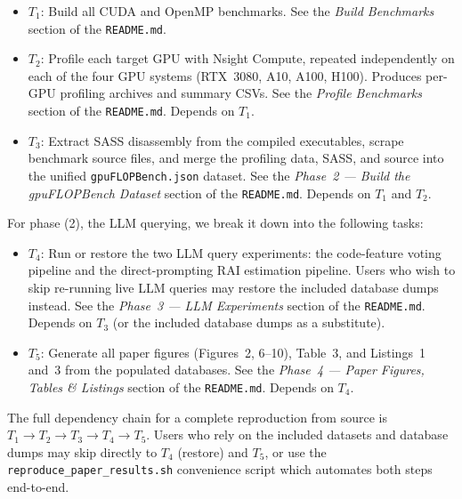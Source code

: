 \documentclass[conference]{IEEEtran}
\begin{document}
\begin{itemize}
    \item $T_1$: Build all \hecbench CUDA and OpenMP benchmarks.
    See the \textit{Build Benchmarks} section of the \texttt{README.md}.

    \item $T_2$: Profile each target GPU with Nsight Compute, repeated independently on each of the four GPU systems (RTX~3080, A10, A100, H100).
    Produces per-GPU profiling archives and summary CSVs.
    See the \textit{Profile Benchmarks} section of the \texttt{README.md}.
    Depends on $T_1$.

    \item $T_3$: Extract SASS disassembly from the compiled executables, scrape benchmark source files, and merge the profiling data, SASS, and source into the unified \texttt{gpuFLOPBench.json} dataset.
    See the \textit{Phase~2 --- Build the gpuFLOPBench Dataset} section of the \texttt{README.md}.
    Depends on $T_1$ and $T_2$.
\end{itemize}

For phase (2), the LLM querying, we break it down into the following tasks:

\begin{itemize}
    \item $T_4$: Run or restore the two LLM query experiments: the code-feature voting pipeline and the direct-prompting RAI estimation pipeline.
    Users who wish to skip re-running live LLM queries may restore the included database dumps instead.
    See the \textit{Phase~3 --- LLM Experiments} section of the \texttt{README.md}.
    Depends on $T_3$ (or the included database dumps as a substitute).

    \item $T_5$: Generate all paper figures (Figures~2, 6--10), Table~3, and Listings~1 and~3 from the populated databases.
    See the \textit{Phase~4 --- Paper Figures, Tables \& Listings} section of the \texttt{README.md}.
    Depends on $T_4$.
\end{itemize}

The full dependency chain for a complete reproduction from source is $T_1 \rightarrow T_2 \rightarrow T_3 \rightarrow T_4 \rightarrow T_5$.
Users who rely on the included datasets and database dumps may skip directly to $T_4$ (restore) and $T_5$, or use the \texttt{reproduce\_paper\_results.sh} convenience script which automates both steps end-to-end.
\end{document}
